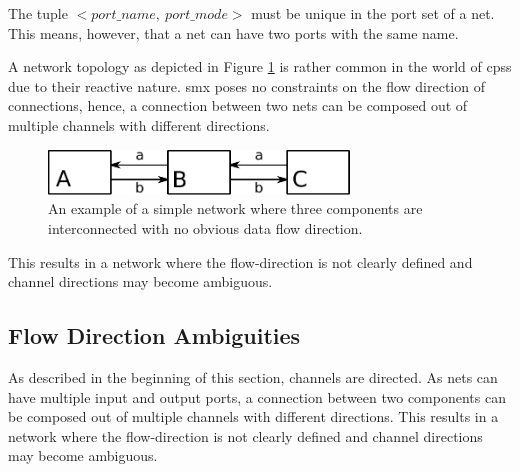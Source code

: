 The tuple $<port\_name,~ port\_mode>$ must be unique in the port set of a net.
This means, however, that a net can have two ports with the same name.

A network topology as depicted in Figure \ref{fig_smx_box_dir} is rather common in the world of \glspl{cps} due to their reactive nature.
\Gls*{smx} poses no constraints on the flow direction of connections, hence, a connection between two nets can be composed out of multiple channels with different directions.
\begin{figure}[bht]
    \centering
    \TopFigSpace
    \includegraphics[width=8cm]{fig/direction_box.pdf}
    \CaptionFigSpace
    \caption{An example of a simple network where three components are interconnected with no obvious data flow direction.}
    \label{fig_smx_box_dir}
    \BotFigSpace
\end{figure}
This results in a network where the flow-direction is not clearly defined and channel directions may become ambiguous.

\subsection{Flow Direction Ambiguities}
\label{sect_smx_nets_flow}
As described in the beginning of this section, channels are directed.
As nets can have multiple input and output ports, a connection between two components can be composed out of multiple channels with different directions.
This results in a network where the flow-direction is not clearly defined and channel directions may become ambiguous.

